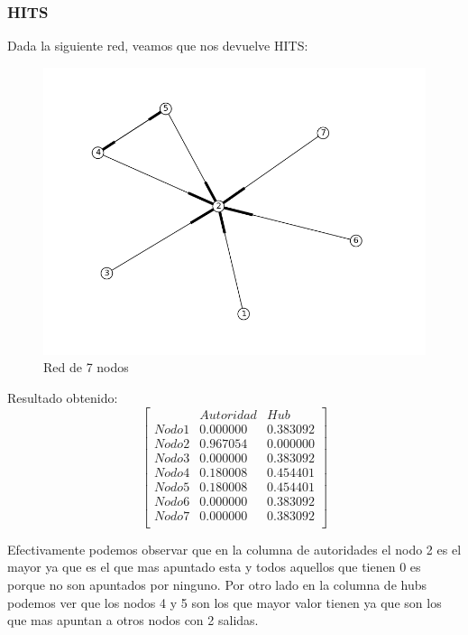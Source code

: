 \subsubsection{HITS}

Dada la siguiente red, veamos que nos devuelve HITS:

 \begin{figure}[!htb]
\begin{center}
    \includegraphics[scale=0.5]{imagenes/test4.png}
    \caption{Red de 7 nodos}
    \end{center}
\end{figure}

Resultado obtenido:
   $$ 
\begin{bmatrix}
              &    Autoridad  &  Hub \\
 Nodo 1 &   0.000000    &      0.383092       \\
 Nodo 2   &  0.967054    &  0.000000     \\
 Nodo 3   &  0.000000   &     0.383092  \\
 Nodo 4   &  0.180008    &     0.454401       \\
 Nodo 5   &  0.180008    &     0.454401        \\
 Nodo 6   &  0.000000    &      0.383092     \\
 Nodo 7   &  0.000000   &     0.383092 \\
\end{bmatrix} 
$$

Efectivamente podemos observar que en la columna de autoridades el nodo 2 es el mayor ya que es el que mas apuntado esta y todos aquellos que tienen 0 es porque no son apuntados por ninguno. Por otro lado en la columna de hubs podemos ver que los nodos 4 y 5 son los que mayor valor tienen ya que son los que mas apuntan a otros nodos con 2 salidas.

